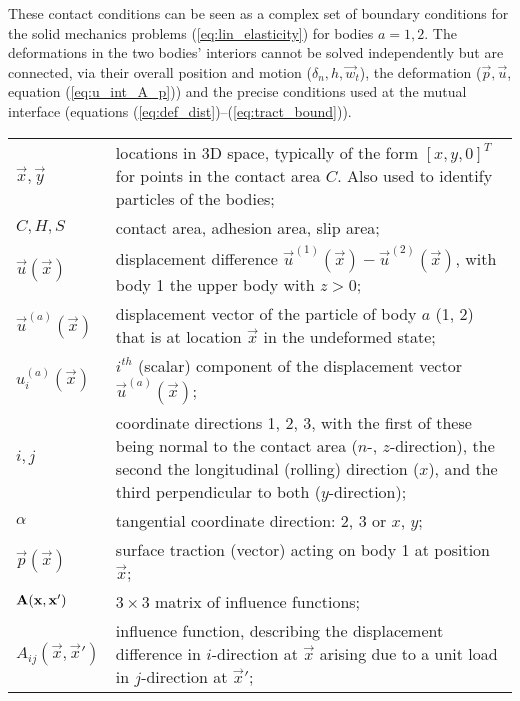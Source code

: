 \documentclass[12pt]{report}
\begin{document}
These contact conditions can be seen as a complex set of boundary conditions
for the solid mechanics problems (\ref{eq:lin_elasticity}) for bodies $a=1,2$.
The deformations in the two bodies' interiors cannot be solved independently
but are connected, via their overall position and motion ($\delta_n, h, 
\vec{w}_t$), the deformation ($\vec{p}, \vec{u}$, equation 
(\ref{eq:u_int_A_p})) and the precise conditions used at the mutual interface
(equations (\ref{eq:def_dist})--(\ref{eq:tract_bound})).

\begin{table}[p]
\begin{tabular}{lp{140mm}}
$\vec{x}, \vec{y}$ & locations in 3D space, typically of the form
                $[x,y,0]^T$ for points in the contact area
                $C$. Also used to identify particles of the bodies; \\[0.5ex]
$C, H, S$     & contact area, adhesion area, slip area;\\[0.5ex]
$\vec{u}(\vec{x})$ & displacement difference $\vec{u}^{(1)}(\vec{x})
                -\vec{u}^{(2)}(\vec{x})$, with body 1 the upper body with
                $z>0$; \\[0.5ex]
$\vec{u}^{(a)}(\vec{x})$ & displacement vector of the particle of body
                $a$ (1, 2) that is at location $\vec{x}$ in the undeformed
                state; \\[0.5ex]
$u_i^{(a)}(\vec{x})$ & $i^{th}$ (scalar) component of the displacement
                vector $\vec{u}^{(a)}(\vec{x})$; \\[0.5ex]
$i, j$        & coordinate directions 1, 2, 3, with the first of these being
                normal to the contact area ($n$-, $z$-direction), the second
                the longitudinal (rolling) direction ($x$), and the third
                perpendicular to both ($y$-direction); \\[0.5ex]
$\alpha$      & tangential coordinate direction: 2, 3 or $x$, $y$; \\[0.5ex]
$\vec{p}(\vec{x})$ & surface traction (vector) acting on body 1 at position
                $\vec{x}$; \\[0.5ex]
$\mathbf{A}(\mathbf{x},\mathbf{x}')$ & $3\times 3$ matrix of influence functions;
                \\[0.5ex]
$A_{ij}(\vec{x},\vec{x}')$ & influence function, describing the displacement
                difference in $i$-direction at $\vec{x}$ arising due to a unit
                load in $j$-direction at $\vec{x}'$; \\[0.5ex]

\end{tabular}
\end{table}
\end{document}
